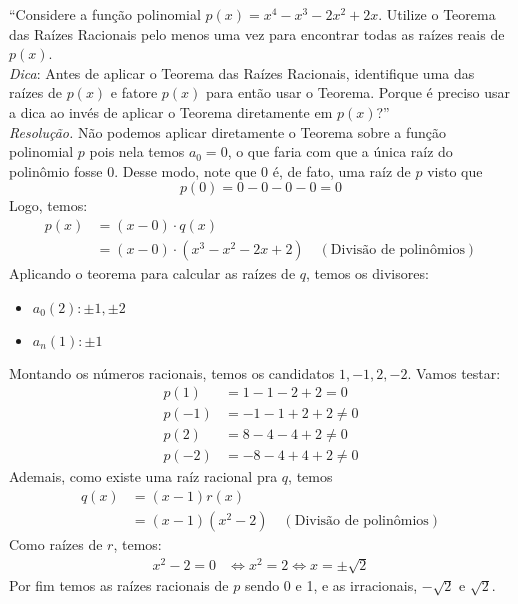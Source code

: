 \enquote{Considere a função polinomial $p(x) = x^4 - x^3 - 2x^2 + 2x$. Utilize o Teorema das Raízes Racionais pelo menos uma vez para encontrar todas as raízes reais de $p(x)$. \\ 
\emph{Dica}: Antes de aplicar o Teorema das Raízes Racionais, identifique uma das raízes de $p(x)$ e fatore $p(x)$ para então usar o Teorema. Porque é preciso usar a dica ao invés de aplicar o Teorema diretamente em $p(x)$?} \\
\emph{Resolução.} Não podemos aplicar diretamente o Teorema sobre a função polinomial $p$ pois nela temos $a_0 = 0$, o que faria com que a única raíz do polinômio fosse 0. Desse modo, note que 0 é, de fato, uma raíz de $p$ visto que
\begin{displaymath}
    p(0) = 0 - 0 - 0 - 0 = 0
\end{displaymath}
Logo, temos:
\begin{align*}
    p(x) &= (x - 0) \cdot q(x) \\ &=
    (x - 0) \cdot (x^3 - x^2 - 2x + 2) \quad (\text{Divisão de polinômios})
\end{align*}
Aplicando o teorema para calcular as raízes de $q$, temos os divisores:
\begin{itemize}
    \item $a_0 (2): \pm 1, \pm 2$ \\
    \item $a_n (1): \pm 1$
\end{itemize}
Montando os números racionais, temos os candidatos $1, -1, 2, -2$. Vamos testar:
\begin{align*}
    p(1) &= 1 - 1 - 2 + 2 = 0 \\
    p(-1) &= -1 - 1 + 2 + 2 \ne 0 \\
    p(2) &= 8 - 4 - 4 + 2 \ne 0 \\
    p(-2) &= -8 -4 + 4 + 2 \ne 0
\end{align*}
Ademais, como existe uma raíz racional pra $q$, temos
\begin{align*}
    q(x) &= (x - 1) r(x) \\ &=
    (x - 1) (x^2 - 2) \quad (\text{Divisão de polinômios})
\end{align*}
Como raízes de $r$, temos:
\begin{align*}
    x^2 - 2 = 0 & \iff x^2 = 2 \iff x = \pm \sqrt{2}
\end{align*}
Por fim temos as raízes racionais de $p$ sendo 0 e 1, e as irracionais, $-\sqrt{2}$ e $\sqrt{2}$.